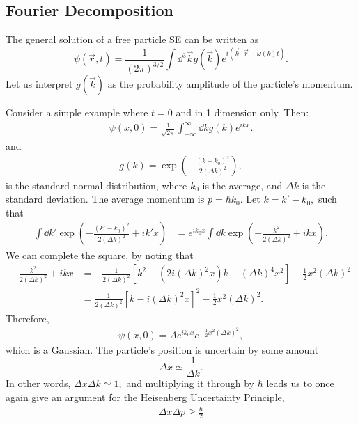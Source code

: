 \documentclass{article}
\numberwithin{equation}{section}
\begin{document}
\subsection{Fourier Decomposition}
The general solution of a free particle SE can be written as
\begin{equation*}
    \psi(\vec{r},t) = \frac{1}{(2\pi)^{3/2}}\int \dd^3\vec{k} g(\vec{k}) e^{i(\vec{k}\cdot \vec{r} - \omega(k)t)}.
\end{equation*} 
Let us interpret $g(\vec{k})$ as the probability amplitude of the particle's momentum.
\begin{example}
    Consider a simple example where $t=0$ and in 1 dimension only. Then:
    \begin{align*}
        \psi(x,0) = \frac{1}{\sqrt{2\pi}}\int_{-\infty}^{\infty} \dd{k} g(k)e^{ikx}.
    \end{align*}
    and
    \begin{align*}
        g(k) = \exp\left(-\frac{(k-k_0)^2}{2(\Delta k)^2}\right),
    \end{align*}
    is the standard normal distribution, where $k_0$ is the average, and $\Delta k$ is the standard deviation.
    The average momentum is $p=\hbar k_0.$ Let $k=k'-k_0,$ such that 
    \begin{align*}
        \int \dd{k'} \exp\left(-\frac{(k'-k_0)^2}{2(\Delta k)^2} + ik'x\right) &= e^{ik_0 x}\int \dd{k} \exp\left(-\frac{k^2}{2(\Delta k)^2} + ikx\right).
    \end{align*}
    We can complete the square, by noting that 
    \begin{align*}
        -\frac{k^2}{2(\Delta k)^2} + ikx &= -\frac{1}{2(\Delta k)^2}\left[k^2 - (2i(\Delta k)^2x)k - (\Delta k)^4x^2\right] - \frac{1}{2}x^2(\Delta k)^2 \\ 
        &= \frac{1}{2(\Delta k)^2}\left[k-i(\Delta k)^2x\right]^2 - \frac{1}{2}x^2(\Delta k)^2.
    \end{align*}
    Therefore,
    \begin{align*}
        \psi(x,0) = Ae^{ik_0x}e^{-\frac{1}{2}x^2(\Delta k)^2},
    \end{align*}
    which is a Gaussian. The particle's position is uncertain by some amount 
    \begin{equation*}
        \Delta x \simeq \frac{1}{\Delta k}.
    \end{equation*}
    In other words, $\Delta x \Delta k \simeq 1,$ and multiplying it through by $\hbar$ leads us to once again give an argument for the Heisenberg Uncertainty Principle,
    \begin{align*}
        \Delta x\Delta p \ge \frac{\hbar}{2}
    \end{align*}
\end{example}
\end{document}
